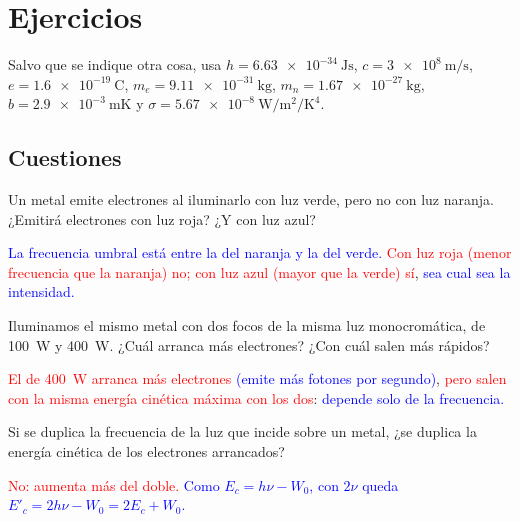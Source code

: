 
\section{Ejercicios}\label{sec:cua-ejercicios}

Salvo que se indique otra cosa, usa \(h = \qty{6.63e-34}{\joule\second}\), \(c = \qty{3e8}{\m\per\second}\),
\(e = \qty{1.6e-19}{\coulomb}\), \(m_e = \qty{9.11e-31}{\kg}\), \(m_n = \qty{1.67e-27}{\kg}\), \(b = \qty{2.9e-3}{\m\kelvin}\) y
\(\sigma = \qty{5.67e-8}{\watt\per\m\squared\per\kelvin\tothe{4}}\).

\subsection{Cuestiones}

\begin{exercise}
    Un metal emite electrones al iluminarlo con luz verde, pero no con luz naranja. ¿Emitirá electrones con luz roja? ¿Y con luz azul?
    \begin{solu}
        \textcolor{blue}{La frecuencia umbral está entre la del naranja y la del verde.} \textcolor{red}{Con luz roja (menor frecuencia que la
        naranja) no; con luz azul (mayor que la verde) sí}, \textcolor{blue}{sea cual sea la intensidad.}
    \end{solu}
\end{exercise}

\begin{exercise}
    Iluminamos el mismo metal con dos focos de la misma luz monocromática, de \qty{100}{\watt} y \qty{400}{\watt}. ¿Cuál arranca más
    electrones? ¿Con cuál salen más rápidos?
    \begin{solu}
        \textcolor{red}{El de \qty{400}{\watt} arranca más electrones} \textcolor{blue}{(emite más fotones por segundo)}, \textcolor{red}{pero salen con la misma
        energía cinética máxima con los dos}: \textcolor{blue}{depende solo de la frecuencia.}
    \end{solu}
\end{exercise}

\begin{exercise}
    Si se duplica la frecuencia de la luz que incide sobre un metal, ¿se duplica la energía cinética de los electrones arrancados?
    \begin{solu}
        \textcolor{red}{No: aumenta más del doble.} \textcolor{blue}{Como \(E_c = h\nu - W_0\), con \(2\nu\) queda \(E'_c = 2h\nu - W_0 = 2E_c + W_0\).}
    \end{solu}
\end{exercise}

